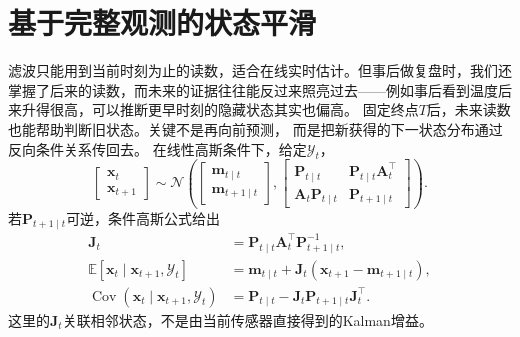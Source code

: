 \section{基于完整观测的状态平滑}
滤波只能用到当前时刻为止的读数，适合在线实时估计。但事后做复盘时，我们还掌握了后来的读数，而未来的证据往往能反过来照亮过去——例如事后看到温度后来升得很高，可以推断更早时刻的隐藏状态其实也偏高。
固定终点$T$后，未来读数也能帮助判断旧状态。关键不是再向前预测，
而是把新获得的下一状态分布通过反向条件关系传回去。
在线性高斯条件下，给定$\mathcal Y_t$，
\[
 \begin{bmatrix}\bm x_t\\\bm x_{t+1}\end{bmatrix}
 \sim\mathcal N\left(
 \begin{bmatrix}\bm m_{t\mid t}\\\bm m_{t+1\mid t}\end{bmatrix},
 \begin{bmatrix}
  \bm P_{t\mid t}&\bm P_{t\mid t}\bm A_t^\top\\
  \bm A_t\bm P_{t\mid t}&\bm P_{t+1\mid t}
 \end{bmatrix}\right).
\]
若$\bm P_{t+1\mid t}$可逆，条件高斯公式给出
\begin{align}
 \bm J_t&=\bm P_{t\mid t}\bm A_t^\top\bm P_{t+1\mid t}^{-1},
    \label{eq:dynamical-rts-gain}\\
 \mathbb E[\bm x_t\mid\bm x_{t+1},\mathcal Y_t]
   &=\bm m_{t\mid t}+\bm J_t(\bm x_{t+1}-\bm m_{t+1\mid t}),
    \label{eq:dynamical-rts-one-step-conditional-mean}\\
 \operatorname{Cov}(\bm x_t\mid\bm x_{t+1},\mathcal Y_t)
   &=\bm P_{t\mid t}-\bm J_t\bm P_{t+1\mid t}\bm J_t^\top.
    \label{eq:dynamical-rts-one-step-conditional-covariance}
\end{align}
这里的$\bm J_t$关联相邻状态，不是由当前传感器直接得到的Kalman增益。

